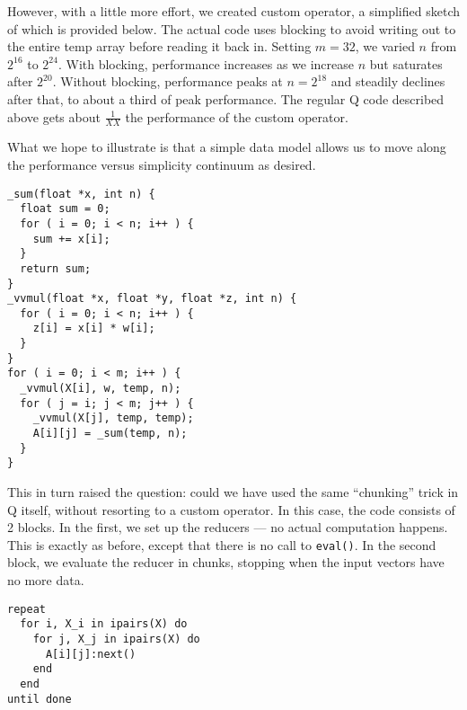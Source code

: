 However, with a little more effort, we created custom operator, 
a simplified sketch of which is provided below. The actual code
uses blocking to avoid writing out to the entire temp array before reading it
back in. Setting \(m=32\), we varied \(n\) from \(2^{16}\) to \(2^{24}\). With
blocking, performance increases as we increase \(n\) but saturates after
\(2^{20}\). Without blocking, performance peaks at \(n=2^{18}\) and steadily
declines after that, to about a third of peak performance.
The regular Q code described above gets about
\(\frac{1}{XX}\) the performance of the custom operator. 

What we hope to illustrate is that a
simple data model allows us to move along the performance versus simplicity
continuum as desired.
\begin{verbatim}
_sum(float *x, int n) {
  float sum = 0;
  for ( i = 0; i < n; i++ ) { 
    sum += x[i];
  }
  return sum;
}
_vvmul(float *x, float *y, float *z, int n) {
  for ( i = 0; i < n; i++ ) { 
    z[i] = x[i] * w[i];
  }
}
for ( i = 0; i < m; i++ ) { 
  _vvmul(X[i], w, temp, n);
  for ( j = i; j < m; j++ ) { 
    _vvmul(X[j], temp, temp);
    A[i][j] = _sum(temp, n);
  }
}
\end{verbatim}

This in turn raised the question: could we have used the same ``chunking'' trick
in Q itself, without resorting to a custom operator. In this case, the code
consists of 2 blocks. In the first, we set up the reducers --- no actual
computation happens. This is exactly as before, except that there is no call to
{\tt eval()}. In the second block, we evaluate the reducer in chunks, stopping
when the input vectors have no more data.
\begin{verbatim}
repeat 
  for i, X_i in ipairs(X) do
    for j, X_j in ipairs(X) do
      A[i][j]:next()
    end
  end
until done 
\end{verbatim}

